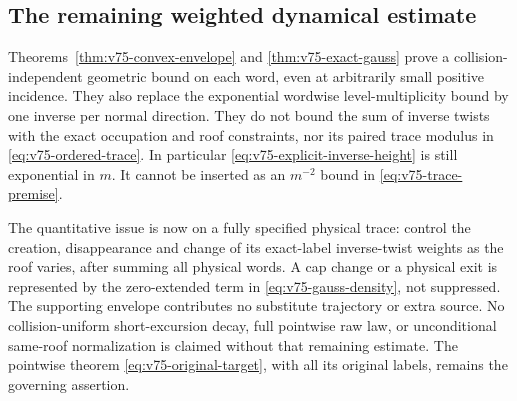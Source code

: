 \subsection{The remaining weighted dynamical estimate}
Theorems~\ref{thm:v75-convex-envelope} and
\ref{thm:v75-exact-gauss} prove a collision-independent geometric
bound on each word, even at arbitrarily small positive incidence.
They also replace the exponential wordwise level-multiplicity bound
by one inverse per normal direction. They do not bound the sum of
inverse twists with the exact occupation and roof constraints, nor
its paired trace modulus in \eqref{eq:v75-ordered-trace}. In
particular \eqref{eq:v75-explicit-inverse-height} is still exponential
in $m$. It cannot be inserted as an $m^{-2}$ bound in
\eqref{eq:v75-trace-premise}.

The quantitative issue is now on a fully specified physical trace:
control the creation, disappearance and change of its exact-label
inverse-twist weights as the roof varies, after summing all physical
words. A cap change or a physical exit is represented by the
zero-extended term in \eqref{eq:v75-gauss-density}, not suppressed.
The supporting envelope contributes no substitute trajectory or
extra source. No collision-uniform short-excursion decay, full
pointwise raw law, or unconditional same-roof normalization is
claimed without that remaining estimate. The pointwise theorem
\eqref{eq:v75-original-target}, with all its original labels, remains
the governing assertion.
